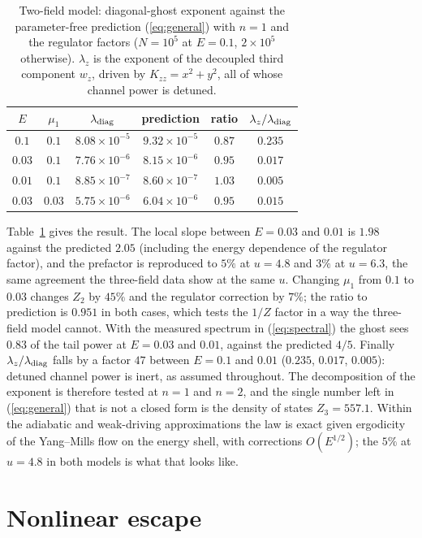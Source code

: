 \documentclass[11pt,a4paper]{article}
\begin{document}
\begin{table}
\centering
\caption{Two-field model: diagonal-ghost exponent against the parameter-free prediction
(\ref{eq:general}) with $n=1$ and the regulator factors ($N=10^5$ at $E=0.1$, $2\times10^5$
otherwise). $\lambda_z$ is the exponent of the decoupled third component $w_z$, driven by
$K_{zz}=x^2+y^2$, all of whose channel power is detuned.}
\label{tab:twofield}
\begin{tabular}{cccccc}
\toprule
$E$ & $\mu_1$ & $\lambda_{\rm diag}$ & prediction & ratio & $\lambda_z/\lambda_{\rm diag}$\\
\midrule
$0.1$  & $0.1$  & $8.08\times10^{-5}$ & $9.32\times10^{-5}$ & $0.87$ & $0.235$\\
$0.03$ & $0.1$  & $7.76\times10^{-6}$ & $8.15\times10^{-6}$ & $0.95$ & $0.017$\\
$0.01$ & $0.1$  & $8.85\times10^{-7}$ & $8.60\times10^{-7}$ & $1.03$ & $0.005$\\
$0.03$ & $0.03$ & $5.75\times10^{-6}$ & $6.04\times10^{-6}$ & $0.95$ & $0.015$\\
\bottomrule
\end{tabular}
\end{table}

Table~\ref{tab:twofield} gives the result. The local slope between $E=0.03$ and $0.01$ is
$1.98$ against the predicted $2.05$ (including the energy dependence of the regulator factor),
and the prefactor is reproduced to $5\%$ at $u=4.8$ and $3\%$ at $u=6.3$, the same agreement the
three-field data show at the same $u$. Changing $\mu_1$ from
$0.1$ to $0.03$ changes $Z_2$ by $45\%$ and the regulator correction by $7\%$; the ratio to
prediction is $0.951$ in both cases, which tests the $1/Z$ factor in a way the three-field model
cannot. With the measured spectrum in (\ref{eq:spectral}) the ghost sees $0.83$ of the tail
power at $E=0.03$ and $0.01$, against the predicted $4/5$. Finally $\lambda_z/\lambda_{\rm diag}$
falls by a factor $47$ between $E=0.1$ and $0.01$ ($0.235$, $0.017$, $0.005$): detuned channel
power is inert, as assumed throughout. The decomposition of the exponent is therefore
tested at $n=1$ and $n=2$, and the single number left in (\ref{eq:general}) that is not a closed
form is the density of states $Z_3=557.1$. Within the adiabatic and weak-driving approximations
the law is exact given ergodicity of the Yang--Mills flow on the energy shell, with corrections
$O(E^{1/2})$; the $5\%$ at $u=4.8$ in both models is what that looks like.

\section{Nonlinear escape}
\label{sec:nonlinear}
\end{document}
